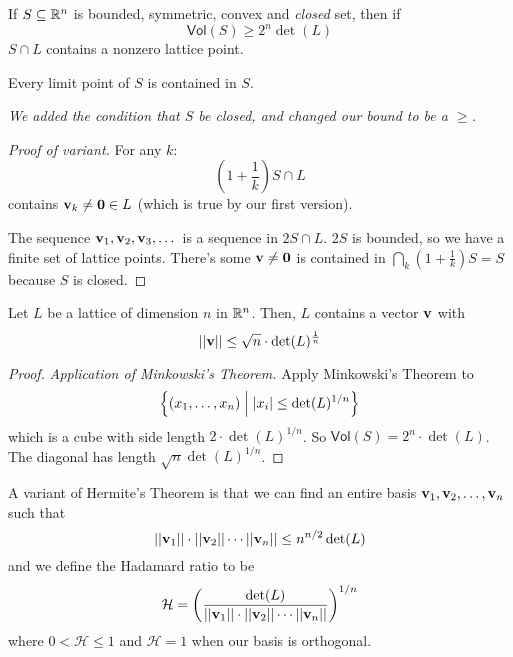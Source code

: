 \begin{theorem}
    If $S\subseteq \mathbb R^n$ is bounded, symmetric, convex and \emph{closed} set, then if
    \[\mathsf{Vol}(S)\geq 2^n\det(L)\]
    $S\cap L$ contains a nonzero lattice point.
\end{theorem}
\begin{definition}
    Every limit point of $S$ is contained in $S$.
\end{definition}
\emph{We added the condition that $S$ be closed, and changed our bound to be a $\geq$. }
\begin{proof}[Proof of variant]
    For any $k$:
    \[\left( 1 + \frac{1}{k} \right)S \cap L\]
    contains $\mathbf{v}_k\neq \mathbf{0}\in L$ (which is true by our first version).

    The sequence $\mathbf{v}_1, \mathbf{v}_2, \mathbf{v}_3, \dots$ is a sequence in $2S\cap L$. $2S$ is bounded, so we have a finite set of lattice points. There's some $\mathbf{v}\neq \mathbf{0}$ is contained in $\bigcap_{k}\left( 1 + \frac{1}{k} \right) S = S$ because $S$ is closed.
\end{proof}
\begin{corollary}
    Let $L$ be a lattice of dimension $n$ in $\mathbb R^n$. Then, $L$ contains a vector $\mathbf{v}$ with
    \[||\mathbf{v|}|\leq \sqrt{n}\cdot \det(L)^\frac{1}{n}\]
\end{corollary}
\begin{proof}
    \emph{Application of Minkowski's Theorem.} Apply Minkowski's Theorem to
    \[\left\{ (x_1, \dots, x_n)\Bigm\vert |x_i|\leq \det(L)^{1/n} \right\}\]
    which is a cube with side length $2\cdot \det(L)^{1/n}$. So $\textsf{Vol}(S) = 2^n\cdot \det(L)$. The diagonal has length $\sqrt{n}\det(L)^{1/n}$.
\end{proof}
A variant of Hermite's Theorem is that we can find an entire basis $\mathbf{v}_1, \mathbf{v}_2, \dots, \mathbf{v}_n$ such that
\[||\mathbf{v}_1||\cdot||\mathbf{v}_2||\cdots ||\mathbf{v}_n|| \leq n^{n/2}\det(L)\]
and we define the Hadamard ratio to be
\[\mathcal{H} = \left( \frac{\det(L)}{||\mathbf{v}_1||\cdot||\mathbf{v}_2||\cdots ||\mathbf{v}_n||} \right)^{1/n}\]
where $0< \mathcal{H} \leq 1$ and $\mathcal{H} = 1$ when our basis is orthogonal.